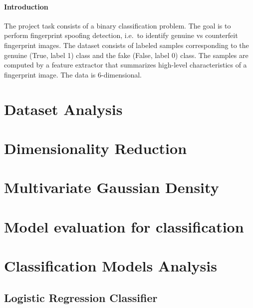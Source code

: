 \documentclass{article}
\begin{document}
    


    \paragraph{Introduction}
    The project task consists of a binary classification problem.
    The goal is to perform fingerprint spoofing detection, i.e.\ to identify genuine vs counterfeit fingerprint images.
    The dataset consists of labeled samples corresponding to the genuine (True, label 1) class and the fake (False, label 0) class.
    The samples are computed by a feature extractor that summarizes high-level characteristics of a fingerprint
    image.
    The data is 6-dimensional.



    \section{Dataset Analysis}
    \label{sec:datasetAnalysis}
    




    \section{Dimensionality Reduction}
    \label{sec:dimensionalityReduction}
    



    \section{Multivariate Gaussian Density}
    \label{sec:multivariateGaussianDensity}
    



    \section{Model evaluation for classification}
    \label{sec:modelEvalution}
    


    \section{Classification Models Analysis}
    \label{sec:classificationModels}
    

    


    \subsection{Logistic Regression Classifier}
    \label{subsec:logisticRegressionClassifier}
    
\end{document}

